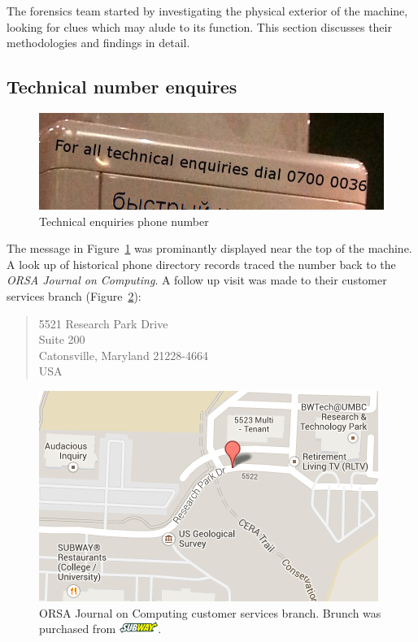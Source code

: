 The forensics team started by investigating the physical exterior of the machine, looking for clues which may alude to its function. This section discusses their methodologies and findings in detail.


\subsection{Technical number enquires}

\begin{figure}[h]
	\centering
	\includegraphics[width=0.8\columnwidth]{img/phone-enquiries.jpg}
	\caption{Technical enquiries phone number}
	\label{fig:technical-enquiries}
\end{figure}

The message in Figure~\ref{fig:technical-enquiries} was prominantly displayed near the top of the machine. A look up of historical phone directory records traced the number back to the \emph{ORSA Journal on Computing}. 
A follow up visit was made to their customer services branch (Figure~\ref{fig:orsa-map}):

\begin{quote}
5521 Research Park Drive \\
Suite 200 \\
Catonsville, Maryland 21228-4664 \\
USA
\end{quote}

\begin{figure}[h]
	\centering
	\includegraphics[width=0.95\columnwidth]{img/orsa.png}
	\caption{ORSA Journal on Computing customer services branch. Brunch was purchased from \protect \includegraphics[height=0.98em,keepaspectratio]{img/subway.png}.}
	\label{fig:orsa-map}
\end{figure}

